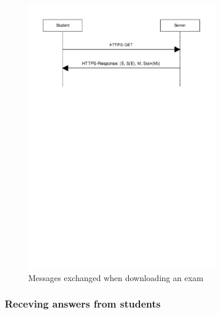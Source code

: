 \documentclass{article}
\begin{document}
\begin{figure}
\begin{center}
\includegraphics[width=0.75\textwidth]{images/download_exam.pdf}
\caption{Messages exchanged when downloading an exam}
\label{fig:download-exam}
\end{center}
\end{figure}


\subsubsection{Receving answers from students}
\end{document}
